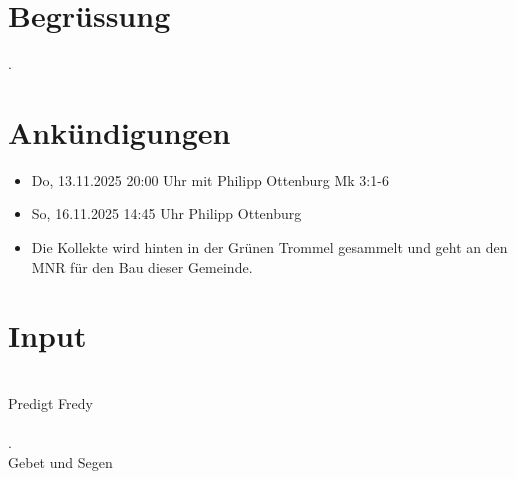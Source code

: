 \documentclass{mybib}
\begin{document}
\section{Begrüssung}

\beten{}

.

\section{Ankündigungen}
\begin{itemize}
    \item {} Do, 13.11.2025 20:00 Uhr mit Philipp Ottenburg Mk 3:1-6
    \item {} So, 16.11.2025 14:45 Uhr Philipp Ottenburg
    \item Die Kollekte wird hinten in der Grünen Trommel gesammelt und geht an den MNR für den Bau dieser Gemeinde.
\end{itemize}

\section{ Input }
   
    \\
    Predigt Fredy\\
    \\
    .
    \\
    Gebet und Segen\\
\end{document}
